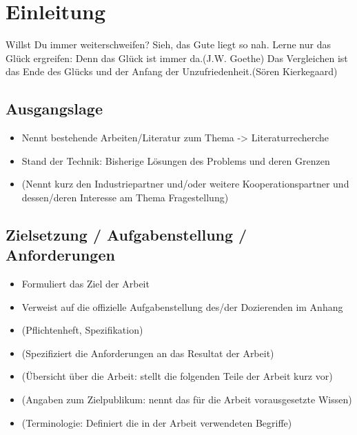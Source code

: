 %
%

\chapter{Einleitung}\label{chap.einleitung}
\glqq Willst Du immer weiterschweifen?
Sieh, das Gute liegt so nah.
Lerne nur das Glück ergreifen:
Denn das Glück ist immer da.\grqq  (J.W. Goethe) \newline
\glqq Das Vergleichen ist das Ende des Glücks und der Anfang
der Unzufriedenheit.\grqq (Sören Kierkegaard)


\section{Ausgangslage}\label{ausgangslage}

\begin{itemize}
\item Nennt bestehende Arbeiten/Literatur zum Thema -> Literaturrecherche
\item Stand der Technik: Bisherige Lösungen des Problems und deren Grenzen
\item (Nennt kurz den Industriepartner und/oder weitere Kooperationspartner und dessen/deren Interesse am Thema Fragestellung)
\end{itemize}



\section{Zielsetzung / Aufgabenstellung / Anforderungen}\label{zielsetzung}

\begin{itemize}
\item Formuliert das Ziel der Arbeit
\item Verweist auf die offizielle Aufgabenstellung des/der Dozierenden im Anhang
\item (Pflichtenheft, Spezifikation)
\item (Spezifiziert die Anforderungen an das Resultat der Arbeit)
\item (Übersicht über die Arbeit: stellt die folgenden Teile der Arbeit kurz vor)
\item (Angaben zum Zielpublikum: nennt das für die Arbeit vorausgesetzte Wissen)
\item (Terminologie: Definiert die in der Arbeit verwendeten Begriffe)
\end{itemize}
